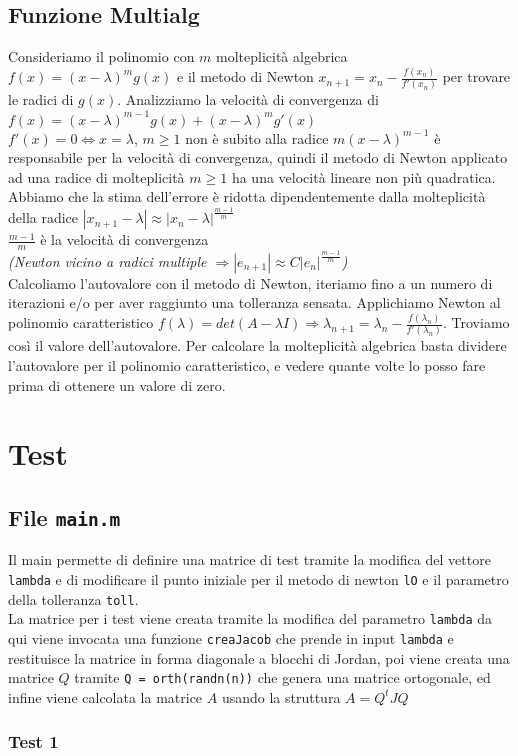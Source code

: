 \documentclass[12pt]{article}
\begin{document}
    \subsection{Funzione Multialg}
    Consideriamo il polinomio con $m$ molteplicità algebrica $f(x)=(x-\lambda)^m g(x)$ e il metodo di Newton $x_{n+1}=x_n - \frac{f(x_n)}{f'(x_n)}$ per trovare le radici di $g(x)$.
    Analizziamo la velocità di convergenza di $f(x)=(x-\lambda)^{m-1} g(x) + (x-\lambda)^m g'(x)$\\
    $f'(x) = 0 \iff x = \lambda$, $m \geq 1$ non è subito alla radice $m(x-\lambda)^{m-1}$ è responsabile per la velocità di convergenza, quindi il metodo di Newton applicato ad una radice di molteplicità $m\geq 1$ ha una velocità lineare non più quadratica.\\
    Abbiamo che la stima dell'errore è ridotta dipendentemente dalla molteplicità della radice $|x_{n+1}-\lambda| \approx |x_n - \lambda|^{\frac{m-1}{m}}$\\
    $\frac{m-1}{m}$ è la velocità di convergenza\\ \textit{(Newton vicino a radici multiple $\Rightarrow |e_{n+1}| \approx C|e_n|^{\frac{m-1}{m}}$)}\\
    Calcoliamo l'autovalore con il metodo di Newton, iteriamo fino a un numero di iterazioni e/o per aver raggiunto una tolleranza sensata. Applichiamo Newton al polinomio caratteristico $f(\lambda) = det(A-\lambda I) \Rightarrow \lambda_{n+1} = \lambda_n - \frac{f(\lambda_n)}{f'(\lambda_n)}$. Troviamo così il valore dell'autovalore.
    Per calcolare la molteplicità algebrica basta dividere l'autovalore per il polinomio caratteristico, e vedere quante volte lo posso fare prima di ottenere un valore di zero.
    
    \section{Test}
    \subsection{File \texttt{main.m}}
    Il main permette di definire una matrice di test tramite la modifica del vettore \texttt{lambda} e  di modificare il punto iniziale per il metodo di newton \texttt{lO} e il parametro della tolleranza \texttt{toll}.\\
    La matrice per i test viene creata tramite la modifica del parametro \texttt{lambda} da qui viene invocata una funzione \texttt{creaJacob} che prende in input \texttt{lambda} e restituisce la matrice in forma diagonale a blocchi di Jordan, poi viene creata una matrice $Q$ tramite \texttt{Q = orth(randn(n))} che genera una matrice ortogonale, ed infine viene calcolata la matrice $A$ usando la struttura $A=Q^tJQ$\\
    \subsubsection{Test 1}
    
\end{document}
